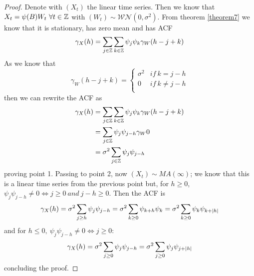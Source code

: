 \begin{proof}
    Denote with $(X_t)$ the linear time series. Then we know that $X_t=\psi(B)W_t\ \forall t\in\mathbb{Z}$ with $(W_t)\sim\mathcal{WN}(0,\sigma^2)$. From theorem \ref{theorem7} we know that it is stationary, has zero mean and has ACF
    \[
        \gamma_X(h)=\sum_{j\in\mathbb{Z}}\sum_{k\in\mathbb{Z}}\psi_j\psi_k\gamma_W(h-j+k)
    \]
    As we know that
    \[
        \gamma_W(h-j+k)=\begin{cases}
            \sigma^2&if\ k=j-h\\
            0&if\ k\ne j-h\\
        \end{cases}  
    \]
    then we can rewrite the ACF as
    \begin{equation*}
        \begin{split}
            \gamma_X(h)&=\sum_{j\in\mathbb{Z}}\sum_{k\in\mathbb{Z}}\psi_j\psi_k\gamma_W(h-j+k)\\
            &=\sum_{j\in\mathbb{Z}}\psi_j\psi_{j-h}\gamma_W{0}\\
            &=\sigma^2\sum_{j\in\mathbb{Z}}\psi_j\psi_{j-h}
        \end{split}
    \end{equation*}
    proving point 1. Passing to point 2, now $(X_t)\sim MA(\infty)$; we know that this is a linear time series from the previous point but, for $h\ge0$, $\psi_j\psi_{j-h}\ne0\iff j\ge0\ and\ j-h\ge0$. Then the ACF is
    \[
        \gamma_X(h)=\sigma^2\sum_{j\ge h}\psi_j\psi_{j-h}=\sigma^2\sum_{k\ge0}\psi_{k+h}\psi_{k}=\sigma^2\sum_{k\ge0}\psi_k\psi_{k+\left|h\right|}
    \]
    and for $h\le0,\ \psi_j\psi_{j-h}\ne0\iff j\ge0$:
    \[
        \gamma_X(h)=\sigma^2\sum_{j\ge0}\psi_j\psi_{j-h}=\sigma^2\sum_{j\ge0}\psi_j\psi_{j+\left|h\right|}  
    \]
    concluding the proof.
\end{proof}

